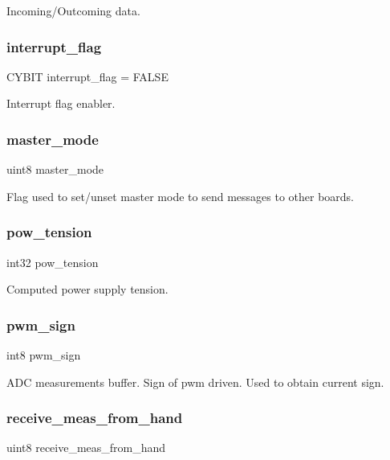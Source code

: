 Incoming/\+Outcoming data. \mbox{\label{globals_8c_a1e6fda88dfdabc63859f8907eb702920}} 
\subsubsection{interrupt\+\_\+flag}
{\footnotesize\ttfamily C\+Y\+B\+IT interrupt\+\_\+flag = F\+A\+L\+SE}

Interrupt flag enabler. \mbox{\label{globals_8c_acf0e2a5d5954714103e295ac35513215}} 
\subsubsection{master\+\_\+mode}
{\footnotesize\ttfamily uint8 master\+\_\+mode}

Flag used to set/unset master mode to send messages to other boards. \mbox{\label{globals_8c_a63d713ff9ac5ba0651f6af9115a32e4d}} 
\subsubsection{pow\+\_\+tension}
{\footnotesize\ttfamily int32 pow\+\_\+tension}

Computed power supply tension. \mbox{\label{globals_8c_a8ac7ad7c894db750e93bc745818e26ca}} 
\subsubsection{pwm\+\_\+sign}
{\footnotesize\ttfamily int8 pwm\+\_\+sign}

A\+DC measurements buffer. Sign of pwm driven. Used to obtain current sign. \mbox{\label{globals_8c_a50b50a565306d9a28c9e86694428a759}} 
\subsubsection{receive\+\_\+meas\+\_\+from\+\_\+hand}
{\footnotesize\ttfamily uint8 receive\+\_\+meas\+\_\+from\+\_\+hand}

